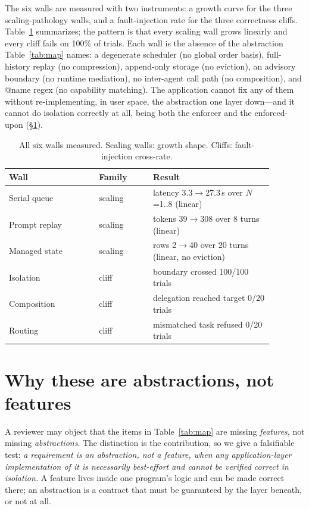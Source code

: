 \documentclass[sigconf, review, anonymous]{acmart}
\begin{document}
The six walls are measured with two instruments: a growth curve for the
three scaling-pathology walls, and a fault-injection rate for the three
correctness cliffs. Table~\ref{tab:measured} summarizes; the pattern is
that every scaling wall grows linearly and every cliff fails on 100\% of
trials. Each wall is the absence of the abstraction Table~\ref{tab:map}
names: a degenerate scheduler (no global order basis), full-history replay
(no compression), append-only storage (no eviction), an advisory boundary
(no runtime mediation), no inter-agent call path (no composition), and
@name regex (no capability matching). The application cannot fix any of
them without re-implementing, in user space, the abstraction one layer
down---and it cannot do isolation correctly at all, being both the enforcer
and the enforced-upon (\S\ref{sec:abstractions}).

\begin{table}[t]
\caption{All six walls measured. Scaling walls: growth shape. Cliffs: fault-injection cross-rate.}
\label{tab:measured}
\small
\setlength{\tabcolsep}{4pt}
\begin{tabular}{p{0.30\linewidth} p{0.18\linewidth} p{0.40\linewidth}}
\toprule
Wall & Family & Result \\
\midrule
Serial queue & scaling & latency 3.3$\to$27.3\,s over $N$=1..8 (linear) \\
Prompt replay & scaling & tokens 39$\to$308 over 8 turns (linear) \\
Managed state & scaling & rows 2$\to$40 over 20 turns (linear, no eviction) \\
Isolation & cliff & boundary crossed 100/100 trials \\
Composition & cliff & delegation reached target 0/20 trials \\
Routing & cliff & mismatched task refused 0/20 trials \\
\bottomrule
\end{tabular}
\end{table}

\section{Why these are abstractions, not features}
\label{sec:abstractions}

A reviewer may object that the items in Table~\ref{tab:map} are missing
\emph{features}, not missing \emph{abstractions}. The distinction is the
contribution, so we give a falsifiable test: \emph{a requirement is an
abstraction, not a feature, when any application-layer implementation of it
is necessarily best-effort and cannot be verified correct in isolation.} A
feature lives inside one program's logic and can be made correct there; an
abstraction is a contract that must be guaranteed by the layer beneath, or
not at all.
\end{document}
